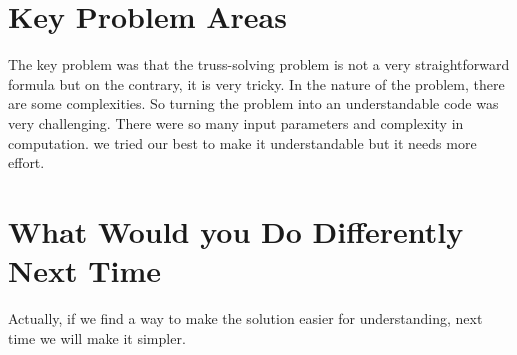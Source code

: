 \documentclass{article}
\begin{document}
\section{Key Problem Areas}

The key problem was that the truss-solving problem is not a very straightforward formula but on the contrary, it is very tricky. In the nature of the problem, there are some complexities. So turning the problem into an understandable code was very challenging. There were so many input parameters and complexity in computation. we tried our best to make it understandable but it needs more effort. 



\section{What Would you Do Differently Next Time}
Actually, if we find a way to make the solution easier for understanding, next time we will make it simpler.
\end{document}
